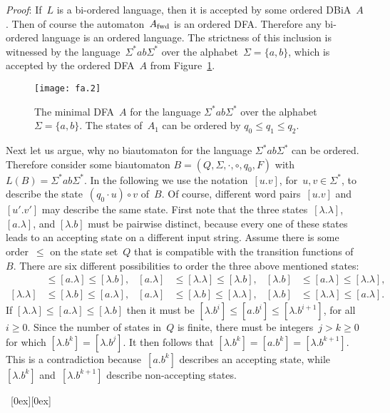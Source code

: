 \documentclass[submission]{eptcs}
\newcommand{\dfa}{\textrm{DFA}}
\newcommand{\dbia}{\textrm{DBiA}}
\newcommand{\fwd}{{\textnormal{fwd}}}
\newcommand*{\qed}{\raisebox{0.5ex}[0ex][0ex]{\framebox[1ex][l]{}}}
\newenvironment{proof}{\par\noindent
  {\rmfamily\itshape\mdseries Proof\/}:\hspace{\labelsep}\ignorespaces}{\mbox{}\nolinebreak\hfill~{\qed}
  \medbreak
}
\begin{document}
\begin{proof}
  If~$L$ is a bi-ordered language, then it is accepted by some ordered
  \dbia~$A$.  Then of course the automaton~$A_\fwd$ is an ordered
  \dfa.  Therefore any bi-ordered language is an ordered language.
  The strictness of this inclusion is witnessed by the
  language~$\Sigma^* ab \Sigma^*$ over the alphabet~$\Sigma=\{a,b\}$,
  which is accepted by the ordered \dfa~$A$ from
  Figure~\ref{fig:ordered-dfa-SigStar-ab-SigStar}.
\begin{figure}
    \centering
    \texttt{[image: fa.2]}
    \caption{The minimal \dfa~$A$ for the language $\Sigma^* ab
      \Sigma^*$ over the alphabet~$\Sigma=\{a,b\}$.  The states
      of~$A_1$ can be ordered by $q_0 \leq q_1 \leq q_2$.}
    \label{fig:ordered-dfa-SigStar-ab-SigStar}
  \end{figure}
  
  Next let us argue, why no biautomaton for the language $\Sigma^* ab
  \Sigma^*$ can be ordered.  Therefore consider some biautomaton
  $B=(Q,\Sigma,\cdot,\circ,q_0,F)$ with $L(B)=\Sigma^* ab\Sigma^*$.
  In the following we use the notation~$[u.v]$, for~$u,v\in\Sigma^*$,
  to describe the state~$(q_0\cdot u)\circ v$ of~$B$.  Of course,
  different word pairs~$[u.v]$ and~$[u'.v']$ may describe the same
  state.  First note that the three states~$[\lambda.\lambda]$,
  $[a.\lambda]$, and $[\lambda.b]$ must be pairwise distinct, because
  every one of these states leads to an accepting state on a different
  input string.  Assume there is some order~$\leq$ on the state
  set~$Q$ that is compatible with the transition functions of~$B$.
  There are six different possibilities to order the three above
  mentioned states:
  \begin{align*}
    [\lambda.\lambda] &\leq [a.\lambda] \leq [\lambda.b], 
    & [a.\lambda] &\leq [\lambda.\lambda] \leq [\lambda.b],
    & [\lambda.b] &\leq [a.\lambda] \leq [\lambda.\lambda], \\
    [\lambda.\lambda] &\leq [\lambda.b] \leq [a.\lambda],
    & [a.\lambda] &\leq [\lambda.b] \leq [\lambda.\lambda],
    & [\lambda.b] &\leq [\lambda.\lambda] \leq [a.\lambda].
  \end{align*}
  If $[\lambda.\lambda] \leq [a.\lambda] \leq [\lambda.b]$ then it
  must be $[\lambda.b^i] \leq [a.b^i] \leq [\lambda.b^{i+1}]$, for
  all~$i\geq 0$.  Since the number of states in~$Q$ is finite, there
  must be integers~$j>k\geq 0$ for which $[\lambda.b^k] =
  [\lambda.b^j]$.  It then follows that $[\lambda.b^k] = [a.b^k] =
  [\lambda.b^{k+1}]$.  This is a contradiction because~$[a.b^k]$
  describes an accepting state, while~$[\lambda.b^k]$
  and~$[\lambda.b^{k+1}]$ describe non-accepting states.


\end{proof}
\end{document}
